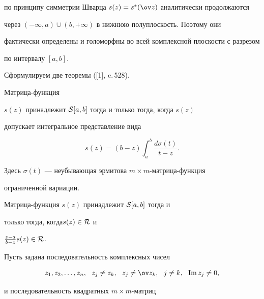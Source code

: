 по принципу симметрии Шварца $s(z)=s^* (\ov z)$ аналитически продолжаются


через $(-\infty,a) \cup (b, +\infty)$ в нижнюю полуплоскость. Поэтому они


фактически определены и голоморфны во всей комплексной плоскости с разрезом


по интервалу $[a,b]$.





Сформулируем две теоремы ([1], c.\,528).





\begin{thm}


Матрица-функция


$s(z)$ принадлежит ${\cal S}[a,b]$ тогда и только тогда, когда $s(z)$


допускает интегральное представление вида


\begin{equation}


s(z)=(b-z) \int_a^b \frac{d \sigma(t)}{t-z}.


\end{equation}


Здесь $\sigma(t)$ --- неубывающая эрмитова $m\times m$-матрица-функция


ограниченной вариации.


\end{thm}





\begin{thm}


Матрица-функция $s(z)$ принадлежит ${\cal S}[a,b]$ тогда и


только тогда, когда\linebreak $s(z) \in {\cal R}$ и


$\frac{z-a}{b-z}s(z) \in {\cal R}$.


\end{thm}





Пусть задана последовательность комплексных чисел


$$


z_1, z_2, \dotsc, z_n, \ \ z_j \neq z_k,\ \ z_j \neq \ov z_k,\ \


j \neq k,\ \ \im z_j \neq 0,


$$


и последовательность квадратных $m \times m$-матриц


